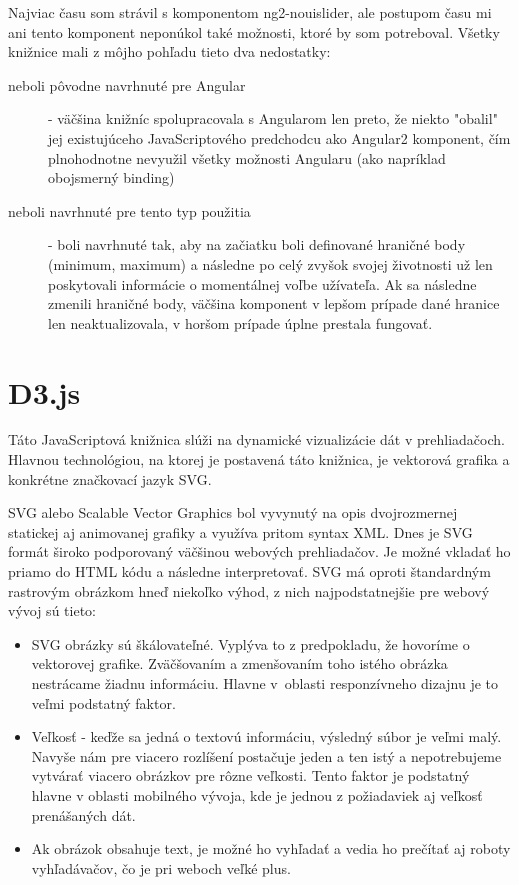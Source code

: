 \documentclass[
  digital, %
  twoside, %
  notable,   %
  nolof,   %
  nolot,   %
]{fithesis3}
\newcommand{\inquotes}[1]{{}"{}#1{}"{}}
\begin{document}
Najviac času som strávil s komponentom ng2-nouislider\cite{ng2nouislider}, ale postupom času mi ani tento komponent neponúkol také možnosti, ktoré by som potreboval. Všetky knižnice mali z môjho pohľadu tieto dva nedostatky:
\begin{description}
\item[neboli pôvodne navrhnuté pre Angular] - väčšina knižníc spolupracovala s Angularom len preto, že niekto \inquotes{obalil} jej existujúceho JavaScriptového predchodcu ako Angular2 komponent, čím plnohodnotne nevyužil všetky možnosti Angularu (ako napríklad obojsmerný binding)
\item[neboli navrhnuté pre tento typ použitia] - boli navrhnuté tak, aby na začiatku boli definované hraničné body (minimum, maximum) a následne po celý zvyšok svojej životnosti už len poskytovali informácie o momentálnej voľbe užívateľa. Ak sa následne zmenili hraničné body, väčšina komponent v lepšom prípade dané hranice len neaktualizovala, v horšom prípade úplne prestala fungovať.
\end{description}

\section{D3.js}
Táto JavaScriptová knižnica slúži na dynamické vizualizácie dát v prehliadačoch. Hlavnou technológiou, na ktorej je postavená táto knižnica, je vektorová grafika a konkrétne značkovací jazyk SVG.

SVG alebo Scalable Vector Graphics bol vyvynutý na opis dvojrozmernej statickej aj animovanej grafiky a využíva pritom syntax XML\cite{quint2003scalable}.
Dnes je SVG formát široko podporovaný väčšinou webových prehliadačov. Je možné vkladať ho priamo do HTML kódu a následne interpretovať. SVG má oproti štandardným rastrovým obrázkom hneď niekoľko výhod, z nich najpodstatnejšie pre webový vývoj sú tieto:
\begin{itemize}
\item SVG obrázky sú škálovateľné. Vyplýva to z predpokladu, že hovoríme o vektorovej grafike. Zväčšovaním a zmenšovaním toho istého obrázka nestrácame žiadnu informáciu. Hlavne v~oblasti responzívneho dizajnu je to veľmi podstatný faktor.
\item Veľkosť - keďže sa jedná o textovú informáciu, výsledný súbor je veľmi malý. Navyše nám pre viacero rozlíšení postačuje jeden a ten istý a nepotrebujeme vytvárať viacero obrázkov pre rôzne veľkosti. Tento faktor je podstatný hlavne v oblasti mobilného vývoja, kde je jednou z požiadaviek aj veľkosť prenášaných dát.
\item Ak obrázok obsahuje text, je možné ho vyhľadať a vedia ho prečítať aj roboty vyhľadávačov, čo je pri weboch veľké plus.
\end{itemize}
\end{document}
